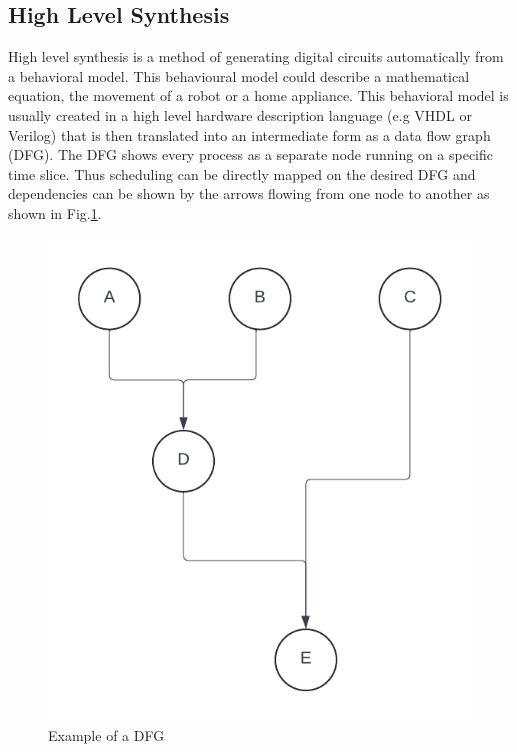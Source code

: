 \documentclass[conference]{IEEEtran}
\begin{document}
\subsection{High Level Synthesis}
High level synthesis is a method of generating digital circuits automatically from a behavioral model. This behavioural model  could describe a mathematical equation, the movement of a robot or a home appliance. This behavioral model is usually created in a high level hardware description language (e.g VHDL or Verilog) that is then translated into an intermediate form as a data flow graph (DFG). The DFG shows every process as a separate node running on a specific time slice. Thus scheduling can be directly mapped on the desired DFG and dependencies can be shown by the arrows flowing from one node to another as shown in Fig.\ref{fig:dfg-example}.
\begin{figure}[h]
    \centering
    \includegraphics[scale=0.3]{cdfg example.png}
    \caption{Example of a DFG }
    \label{fig:dfg-example} 
\end{figure}
\end{document}
